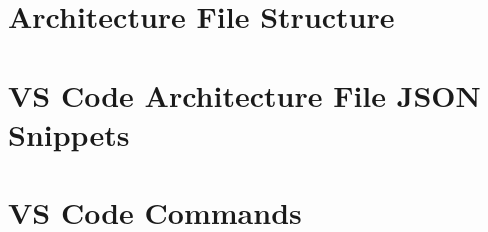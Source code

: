 \appendixpage
\noappendicestocpagenum
\addappheadtotoc
\chapter{Architecture File Structure}
\label{appen:architecture-file-structure}


\chapter{VS Code Architecture File JSON Snippets}
\label{appen:vscode_snippets}


\chapter{VS Code Commands}
\label{appen:vscode_commands}
